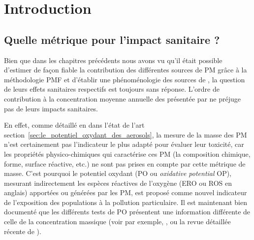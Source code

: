 \section{Introduction}%
\label{sec:intro_PO}

\subsection{Quelle métrique pour l'impact sanitaire ?}%
\label{sub:quelle_métrique_pour_l_impact_sanitaire_}


Bien que dans les chapitres précédents nous avons vu qu'il était possible d'estimer de
façon fiable la contribution des différentes sources de PM grâce à la méthodologie PMF et
d'établir une phénoménologie des sources de \PMdix, la question de leurs effets sanitaires
respectifs est toujours sans réponse. L'ordre de contribution à la concentration
moyenne annuelle des \PMdix{} présentée par \cite[(figure 3)]{weberComparison2019} ne
préjuge pas de leurs impacts sanitaires.

En effet, comme détaillé en dans l'état de l'art
section~\ref{sec:le_potentiel_oxydant_des_aerosols}, la mesure de la masse des PM n'est
certainement pas l'indicateur le plus adapté pour évaluer leur toxicité, car les
propriétés physico-chimiques qui caractérise ces PM (la composition chimique, forme, surface
réactive, etc.) ne sont pas prises en compte par cette métrique de masse.  C'est pourquoi le
potentiel oxydant (PO ou \textit{oxidative potential} OP), mesurant indirectement les espèces réactives de
l'oxygène (ERO ou ROS en anglais) apportées ou générées par les PM, est proposé comme
nouvel indicateur de l'exposition des populations à la pollution particulaire.  Il est
maintenant bien documenté que les différents tests de PO présentent une information
différente de celle de la concentration massique (voir par exemple,
\cite{choRedox2005,vermaReactive2014,batesReactive2015,fangOxidative2016,fangAmbient2017,calasSeasonal2019},
ou la revue détaillée récente de \cite{batesReview2019}).



